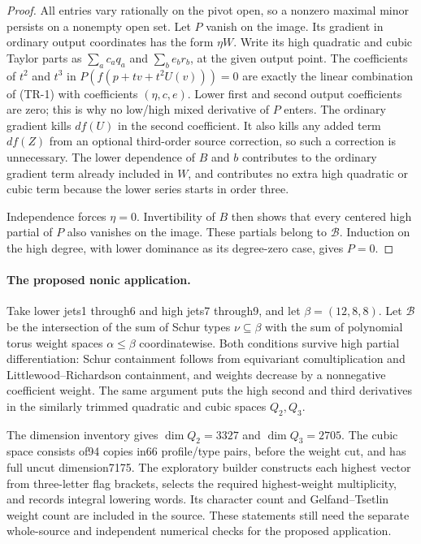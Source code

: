 \begin{proof}
All entries vary rationally on the pivot open, so a nonzero maximal
minor persists on a nonempty open set. Let $P$ vanish on the image.
Its gradient in ordinary output coordinates has the form $\eta W$.
Write its high quadratic and cubic Taylor parts as
$\sum_a c_aq_a$ and $\sum_b e_br_b$, at the given output point.
The coefficients of $t^2$ and $t^3$ in
$P(f(p+t v+t^2U(v)))=0$ are exactly the linear combination of
(TR-1) with coefficients $(\eta,c,e)$. Lower first and second output
coefficients are zero; this is why no low/high mixed derivative of
$P$ enters. The ordinary gradient kills $df(U)$ in the second
coefficient. It also kills any added term $df(Z)$ from an optional
third-order source correction, so such a correction is unnecessary.
The lower dependence of $B$ and $b$ contributes to the ordinary
gradient term already included in $W$, and contributes no extra high
quadratic or cubic term because the lower series starts in order three.

Independence forces $\eta=0$. Invertibility of $B$ then shows that
every centered high partial of $P$ also vanishes on the image. These
partials belong to $\mathcal B$. Induction on the high degree, with
lower dominance as its degree-zero case, gives $P=0$.
\end{proof}

\paragraph{The proposed nonic application.}
Take lower jets1 through6 and high jets7 through9, and let
$\beta=(12,8,8)$. Let $\mathcal B$ be the intersection of the sum
of Schur types $\nu\subseteq\beta$ with the sum of polynomial torus
weight spaces $\alpha\le\beta$ coordinatewise. Both conditions
survive high partial differentiation: Schur containment follows from
equivariant comultiplication and Littlewood--Richardson containment,
and weights decrease by a nonnegative coefficient weight. The same
argument puts the high second and third derivatives in the similarly
trimmed quadratic and cubic spaces $Q_2,Q_3$.

The dimension inventory gives $\dim Q_2=3327$ and $\dim Q_3=2705$.
The cubic space consists of94 copies in66 profile/type pairs, before
the weight cut, and has full uncut dimension7175. The exploratory
builder constructs each highest vector from three-letter flag brackets,
selects the required highest-weight multiplicity, and records integral
lowering words. Its character count and Gelfand--Tsetlin weight count
are included in the source. These statements still need the separate
whole-source and independent numerical checks for the proposed application.

